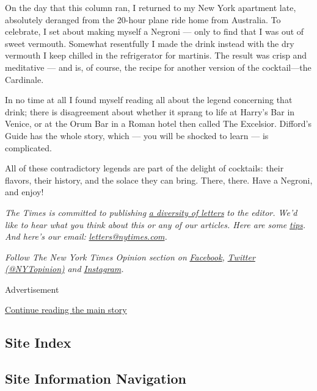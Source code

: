 On the day that this column ran, I returned to my New York apartment
late, absolutely deranged from the 20-hour plane ride home from
Australia. To celebrate, I set about making myself a Negroni --- only to
find that I was out of sweet vermouth. Somewhat resentfully I made the
drink instead with the dry vermouth I keep chilled in the refrigerator
for martinis. The result was crisp and meditative --- and is, of course,
the recipe for another version of the cocktail---the Cardinale.

In no time at all I found myself reading all about the legend concerning
that drink; there is disagreement about whether it sprang to life at
Harry's Bar in Venice, or at the Orum Bar in a Roman hotel then called
The Excelsior. Difford's Guide has the whole story, which --- you will
be shocked to learn --- is complicated.

All of these contradictory legends are part of the delight of cocktails:
their flavors, their history, and the solace they can bring. There,
there. Have a Negroni, and enjoy!

\emph{The Times is committed to publishing}
\href{https://www.nytimes.com/2019/01/31/opinion/letters/letters-to-editor-new-york-times-women.html}{\emph{a
diversity of letters}} \emph{to the editor. We'd like to hear what you
think about this or any of our articles. Here are some}
\href{https://help.nytimes.com/hc/en-us/articles/115014925288-How-to-submit-a-letter-to-the-editor}{\emph{tips}}\emph{.
And here's our email:}
\href{mailto:letters@nytimes.com}{\emph{letters@nytimes.com}}\emph{.}

\emph{Follow The New York Times Opinion section on}
\href{https://www.facebook.com/nytopinion}{\emph{Facebook}}\emph{,}
\href{http://twitter.com/NYTOpinion}{\emph{Twitter (@NYTopinion)}}
\emph{and}
\href{https://www.instagram.com/nytopinion/}{\emph{Instagram}}\emph{.}

Advertisement

\protect\hyperlink{after-bottom}{Continue reading the main story}

\hypertarget{site-index}{%
\subsection{Site Index}\label{site-index}}

\hypertarget{site-information-navigation}{%
\subsection{Site Information
Navigation}\label{site-information-navigation}}

